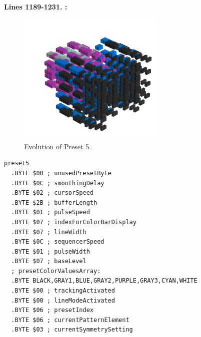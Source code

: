 \textbf{Lines 1189-1231. :} 
\clearpage
\begin{minipage}[b]{0.48\linewidth}

\begin{figure}[H]                                                          
  \centering                                                             
  \begin{adjustbox}{width=7cm,center}                                   
  \includegraphics[width=7cm]{src/presets/pattern5-45.png}%
  \end{adjustbox}                                                        
\caption{Evolution of Preset 5.}                                           
\end{figure}                                                               
\end{minipage}
\hspace{0.1cm}
\begin{minipage}[b]{0.48\linewidth}                                       
                                                                           
\begin{lstlisting}[basicstyle=\ttfamily\scriptsize,caption=Data structure for Preset 5.]
preset5
  .BYTE $00 ; unusedPresetByte
  .BYTE $0C ; smoothingDelay
  .BYTE $02 ; cursorSpeed
  .BYTE $2B ; bufferLength
  .BYTE $01 ; pulseSpeed
  .BYTE $07 ; indexForColorBarDisplay
  .BYTE $07 ; lineWidth
  .BYTE $0C ; sequencerSpeed
  .BYTE $01 ; pulseWidth
  .BYTE $07 ; baseLevel
  ; presetColorValuesArray: 
  .BYTE BLACK,GRAY1,BLUE,GRAY2,PURPLE,GRAY3,CYAN,WHITE
  .BYTE $00 ; trackingActivated
  .BYTE $00 ; lineModeActivated
  .BYTE $06 ; presetIndex
  .BYTE $06 ; currentPatternElement
  .BYTE $03 ; currentSymmetrySetting
\end{lstlisting}
\end{minipage}

